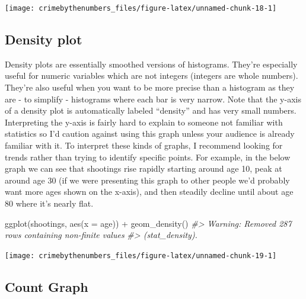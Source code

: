 \documentclass[
  12pt,
  openany]{book}
\newenvironment{Shaded}{\begin{snugshade}}{\end{snugshade}}
\newcommand{\AttributeTok}[1]{\textcolor[rgb]{0.61,0.61,0.61}{#1}}
\newcommand{\CommentTok}[1]{\textcolor[rgb]{0.37,0.37,0.37}{\textit{#1}}}
\newcommand{\FunctionTok}[1]{\textcolor[rgb]{0,0,0}{#1}}
\newcommand{\NormalTok}[1]{#1}
\newcommand{\SpecialCharTok}[1]{\textcolor[rgb]{0,0,0}{#1}}
\begin{document}
\begin{center}\texttt{[image: crimebythenumbers\_files/figure-latex/unnamed-chunk-18-1]} \end{center}

\hypertarget{density-plot}{%
\subsection{Density plot}\label{density-plot}}

Density plots are essentially smoothed versions of histograms. They're especially useful for numeric variables which are not integers (integers are whole numbers). They're also useful when you want to be more precise than a histogram as they are - to simplify - histograms where each bar is very narrow. Note that the y-axis of a density plot is automatically labeled ``density'' and has very small numbers. Interpreting the y-axis is fairly hard to explain to someone not familiar with statistics so I'd caution against using this graph unless your audience is already familiar with it. To interpret these kinds of graphs, I recommend looking for trends rather than trying to identify specific points. For example, in the below graph we can see that shootings rise rapidly starting around age 10, peak at around age 30 (if we were presenting this graph to other people we'd probably want more ages shown on the x-axis), and then steadily decline until about age 80 where it's nearly flat.

\begin{Shaded}
\begin{Highlighting}[]
\FunctionTok{ggplot}\NormalTok{(shootings, }\FunctionTok{aes}\NormalTok{(}\AttributeTok{x =}\NormalTok{ age)) }\SpecialCharTok{+} 
  \FunctionTok{geom\_density}\NormalTok{()}
\CommentTok{\#\textgreater{} Warning: Removed 287 rows containing non{-}finite values}
\CommentTok{\#\textgreater{} (stat\_density).}
\end{Highlighting}
\end{Shaded}

\begin{center}\texttt{[image: crimebythenumbers\_files/figure-latex/unnamed-chunk-19-1]} \end{center}

\hypertarget{count-graph}{%
\subsection{Count Graph}\label{count-graph}}
\end{document}
